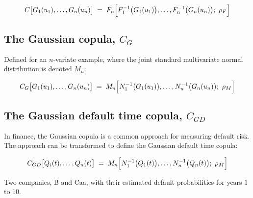 \begin{mrfmlbox}
\[ C\bigl[G_1(u_1), \ldots, G_n(u_n)\bigr] \;=\;
   F_n\Bigl[ F_1^{-1}\bigl(G_1(u_1)\bigr), \ldots, F_n^{-1}\bigl(G_n(u_n)\bigr);\ \rho_F \Bigr] \]
\end{mrfmlbox}

\subsection{The Gaussian copula, $C_G$}
Defined for an $n$-variate example, where the joint standard multivariate normal distribution is
denoted $M_n$:

\begin{mrfmlbox}
\[ C_G\bigl[G_1(u_1), \ldots, G_n(u_n)\bigr] \;=\;
   M_n\Bigl[ N_1^{-1}\bigl(G_1(u_1)\bigr), \ldots, N_n^{-1}\bigl(G_n(u_n)\bigr);\ \rho_M \Bigr] \]
\end{mrfmlbox}

\subsection{The Gaussian default time copula, $C_{GD}$}
In finance, the Gaussian copula is a common approach for measuring default risk. The approach
can be transformed to define the Gaussian default time copula:

\begin{mrfmlbox}
\[ C_{GD}\bigl[Q_i(t), \ldots, Q_n(t)\bigr] \;=\;
   M_n\Bigl[ N_1^{-1}\bigl(Q_1(t)\bigr), \ldots, N_n^{-1}\bigl(Q_n(t)\bigr);\ \rho_M \Bigr] \]
\end{mrfmlbox}

\begin{mrexbox}[title={Example --- applying a Gaussian copula}]
Two companies, B and Caa, with their estimated default probabilities for years 1 to 10.
\end{mrexbox}

